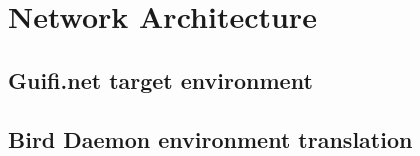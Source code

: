 \chapter{Network Architecture}
\label{ch:architecture}
\pagestyle{headings}

\section{Guifi.net target environment}


\section{Bird Daemon environment translation}